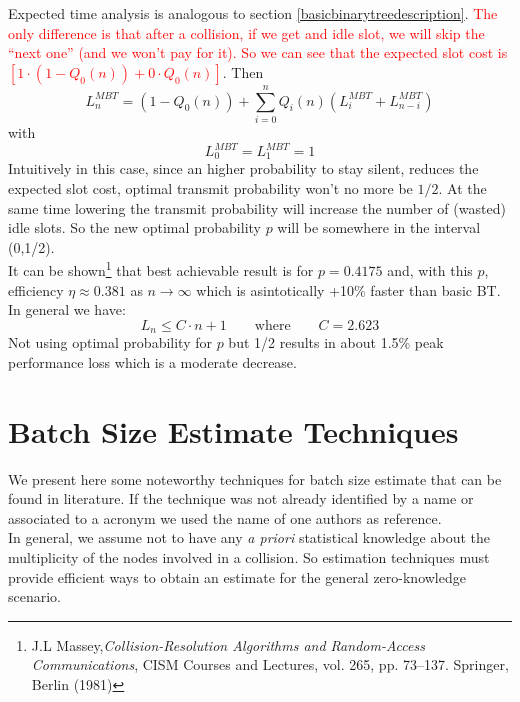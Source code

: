 \documentclass[12pt,a4paper,twocolumns]{report}
\begin{document}
Expected time analysis is analogous  to section \ref{basicbinarytreedescription}. \textcolor{red}{The only difference is that after a collision, if we get and idle slot, we will skip the ``next one'' (and we won't pay for it). So we can see that the expected slot cost is $\left[1 \cdot (1-Q_{0}(n))+ 0\cdot Q_{0}(n)\right]$}. Then\\
\begin{equation}
L_{n}^{MBT} = \left(1 - Q_{0}(n)\right)+\sum_{i=0}^{n} Q_{i}(n) (L_{i}^{MBT}+L_{n-i}^{MBT})
\end{equation}
with
\begin{equation*}
L_{0}^{MBT} = L_{1}^{MBT}  = 1
\end{equation*}
Intuitively in this case, since an higher probability to stay silent, reduces the expected slot cost, optimal transmit probability won't no more be $1/2$. At the same time lowering the transmit probability will increase the number of (wasted) idle slots. So the new optimal probability $p$ will be somewhere in the interval (0,1/2).\\
It can be shown\footnote{  J.L Massey,\emph{Collision-Resolution Algorithms and Random-Access Communications}, CISM Courses and Lectures, vol. 265, pp. 73–137. Springer, Berlin (1981)} that best achievable result is for $p=0.4175$ and, with this $p$, efficiency $\eta \approx 0.381$ as $n \to \infty$ which is asintotically +10\% faster than basic BT.\\
In general we have: 
\begin{equation}
L_{n}\leq C \cdot n +1 \qquad \textrm{where} \qquad C=2.623
\end{equation}
Not using optimal probability for $p$ but 1/2 results in about 1.5\% peak performance loss which is a moderate decrease.\\
\chapter{Batch Size Estimate Techniques}
We present here some noteworthy techniques for batch size estimate that can be found in literature.
If the technique was not already identified by a name or associated to a acronym we used the name of one authors as reference.\\

In general, we assume not to have any \emph{a priori} statistical knowledge about the multiplicity of the nodes involved in a collision. So estimation techniques must provide efficient ways to obtain an estimate for the general zero-knowledge scenario.\\
\end{document}
